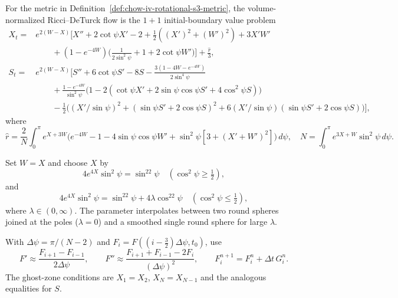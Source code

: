 \begin{proposition}
\label{prop:chow-iv-numerical-deturck-equations}
For the metric in Definition~\ref{def:chow-iv-rotational-s3-metric}, the
volume-normalized Ricci--DeTurck flow is the $1+1$ initial-boundary value
problem
\begin{align*}
 X_t={}&e^{2(W-X)}\!\bigl[X''+2\cot\psi X'-2+\tfrac12((X')^2+(W')^2)
 +3X'W' \\[-2pt]
 &\qquad +(1-e^{-4W})\bigl(\tfrac1{2\sin^2\psi}+1+2\cot\psi W'\bigr)\bigr]
 +\tfrac{\hat r}{3},\\
 S_t={}&e^{2(W-X)}\!\bigl[S''+6\cot\psi S'-8S
 -\frac{3(1-4W-e^{-4W})}{2\sin^4\psi}\\[-2pt]
 &\qquad+\frac{1-e^{-4W}}{\sin^2\psi}
 \bigl(1-2(\cot\psi X'+2\sin\psi\cos\psi S'+4\cos^2\psi S)\bigr)\\[-2pt]
 &\qquad-\tfrac12\bigl((X'/\sin\psi)^2+(\sin\psi S'+2\cos\psi S)^2
 +6(X'/\sin\psi)(\sin\psi S'+2\cos\psi S)\bigr)\bigr],
\end{align*}
where
\[
 \hat r=\frac2N\int_0^\pi e^{X+3W}\bigl(e^{-4W}-1-4\sin\psi\cos\psi W'
 +\sin^2\psi[3+(X'+W')^2]\bigr)\,d\psi,
 \quad N=\int_0^\pi e^{3X+W}\sin^2\psi\,d\psi.
\]
\end{proposition}

\begin{definition}
\label{def:chow-iv-lambda-neckpinch-data}
Set $W=X$ and choose $X$ by
\[
4e^{4X}\sin^2\psi=\sin^22\psi\quad(\cos^2\psi\ge\tfrac12),
\]
and
\[
4e^{4X}\sin^2\psi=\sin^22\psi+4\lambda\cos^22\psi
 \quad(\cos^2\psi\le\tfrac12),
\]
where $\lambda\in(0,\infty)$.  The parameter interpolates between two
round spheres joined at the poles ($\lambda=0$) and a smoothed single round
 sphere for large $\lambda$.
\end{definition}

\begin{definition}
\label{def:chow-iv-finite-difference-scheme}
With $\Delta\psi=\pi/(N-2)$ and
$F_i=F((i-\tfrac32)\Delta\psi,t_0)$, use
\[
 F'\approx\frac{F_{i+1}-F_{i-1}}{2\Delta\psi},\qquad
 F''\approx\frac{F_{i+1}+F_{i-1}-2F_i}{(\Delta\psi)^2},\qquad
 F_i^{n+1}=F_i^n+\Delta t\,G_i^n.
\]
The ghost-zone conditions are $X_1=X_2$, $X_N=X_{N-1}$ and the analogous
equalities for $S$.
\end{definition}


